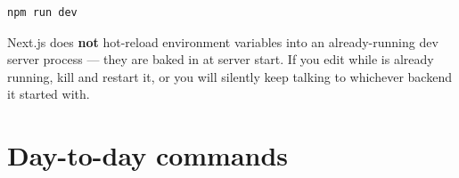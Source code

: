 \begin{lstlisting}[style=olkcodebash, language=bash, caption={Standard Next.js dev server}]
npm run dev
\end{lstlisting}

\begin{olkwarn}
Next.js does \textbf{not} hot-reload  environment variables into an already-running dev server process — they are baked in at server start. If you edit  while  is already running, kill and restart it, or you will silently keep talking to whichever backend it started with.
\end{olkwarn}

\section{Day-to-day commands}

